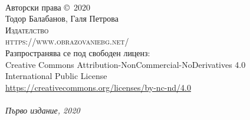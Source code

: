 ~\vfill
\thispagestyle{empty}

\noindent Авторски права \copyright\ 2020 \\

\noindent Тодор Балабанов, Галя Петрова \\ 

\noindent \textsc{Издателство } \\
\noindent \textsc{https://www.obrazovaniebg.net/} \\

\noindent Разпространява се под свободен лиценз: \\ 
Creative Commons Attribution-NonCommercial-NoDerivatives 4.0 \\
International Public License \\
\url{https://creativecommons.org/licenses/by-nc-nd/4.0} \\

 \\

\noindent \textit{Първо издание, 2020}